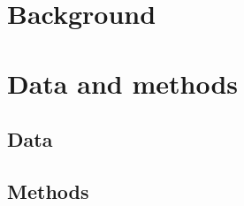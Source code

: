 \documentclass[12pt]{article}
\begin{document}
\section{Background}

\subsection{}
\subsubsection{}
\subsection{}

\section{Data and methods}

\subsection{Data}

\subsection{Methods}

\printbibliography
\end{document}
